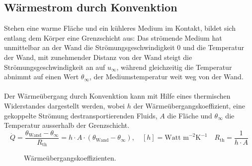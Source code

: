 \subsection{Wärmestrom durch Konvenktion}
Stehen eine warme Fläche und ein kühleres Medium im Kontakt, bildet sich entlang dem Körper eine Grenzschicht aus: Das strömende Medium hat unmittelbar an der Wand die Strömungsgeschwindigkeit 0 und die Temperatur der Wand, mit zunehmender Distanz von der Wand steigt die Strömungsgeschwindigkeit an auf $u_{\infty}$, während gleichzeitig die Temperatur abnimmt auf einen Wert $\theta_{\infty}$, der Mediumstemperatur weit weg von der Wand.
\\\\
Der Wärmeübergang durch Konvenktion kann mit Hilfe eines thermischen Widerstandes dargestellt werden, wobei $h$ der Wärmeübergangskoeffizient, eine gekoppelte Strömung destransportierenden Fluids, $A$ die Fläche und $\theta_{\infty}$ die Temperatur ausserhalb der Grenzschicht.
\begin{equation}
\boxed{\dot{Q}=\dfrac{\theta_{\text{Wand}}-\theta_{\infty}}{R_{\text{th}}}=h\cdot A\cdot \left(\theta_{\text{Wand}}-\theta_{\infty}\right),\quad [h]=\text{Watt m}^{-2}\text{K}^{-1}}\quad \boxed{R_{\text{th}}=\dfrac{1}{h\cdot A}}
\end{equation}
\begin{figure}[H]
\centering
\caption{Wärmeübergangskoeffizienten.}
\label{fig_Im}
\end{figure}
